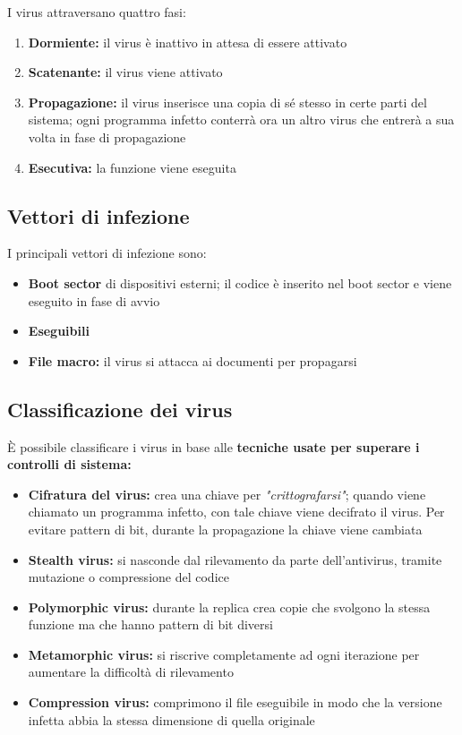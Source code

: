 \noindent I virus attraversano quattro fasi:
\begin{enumerate}
    \item \textbf{Dormiente:} il virus è inattivo in attesa di essere attivato 
    \item \textbf{Scatenante:} il virus viene attivato 
    \item \textbf{Propagazione:} il virus inserisce una copia di sé stesso in certe parti del sistema; ogni programma 
    infetto conterrà ora un altro virus che entrerà a sua volta in fase di propagazione 
    \item \textbf{Esecutiva:} la funzione viene eseguita
\end{enumerate}

\subsection{Vettori di infezione}
I principali vettori di infezione sono:
\begin{itemize}
    \item \textbf{Boot sector} di dispositivi esterni; il codice è inserito nel boot sector e viene 
    eseguito in fase di avvio 
    \item \textbf{Eseguibili}
    \item \textbf{File macro:} il virus si attacca ai documenti per propagarsi 
\end{itemize}

\subsection{Classificazione dei virus}
È possibile classificare i virus in base alle \textbf{tecniche usate per superare i controlli 
di sistema:}
\begin{itemize}
    \item \textbf{Cifratura del virus:} crea una chiave per \textit{"crittografarsi"}; quando viene 
    chiamato un programma infetto, con tale chiave viene decifrato il virus. Per evitare pattern 
    di bit, durante la propagazione la chiave viene cambiata
    \item \textbf{Stealth virus:} si nasconde dal rilevamento da parte dell'antivirus, tramite mutazione 
    o compressione del codice 
    \item \textbf{Polymorphic virus:} durante la replica crea copie che svolgono la stessa funzione 
    ma che hanno pattern di bit diversi 
    \item \textbf{Metamorphic virus:} si riscrive completamente ad ogni iterazione per aumentare la 
    difficoltà di rilevamento
    \item \textbf{Compression virus:} comprimono il file eseguibile in modo che la versione infetta 
    abbia la stessa dimensione di quella originale
\end{itemize} 


